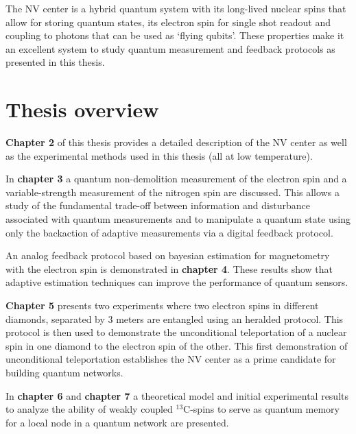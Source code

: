 The NV center is a hybrid quantum system with its long-lived nuclear spins that allow for storing quantum states, its electron spin for single shot readout and coupling to photons that can be used as `flying qubits'. These properties make it an excellent system to study quantum measurement and feedback protocols as presented in this thesis.

\section{Thesis overview}

\textbf{Chapter 2} of this thesis provides a detailed description of the NV center as well as the experimental methods used in this thesis (all at low temperature).

In \textbf{chapter 3} a quantum non-demolition measurement of the electron spin and a variable-strength measurement of the nitrogen spin are discussed. This allows a study of the fundamental trade-off between information and disturbance associated with quantum measurements and to manipulate a quantum state using only the backaction of adaptive measurements via a digital feedback protocol.

An analog feedback protocol based on bayesian estimation for magnetometry with the electron spin is demonstrated in \textbf{chapter 4}. These results show that adaptive estimation techniques can improve the performance of quantum sensors.

\textbf{Chapter 5} presents two experiments where two electron spins in different diamonds, separated by 3 meters are entangled using an heralded protocol. This protocol is then used to demonstrate the unconditional teleportation of a nuclear spin in one diamond to the electron spin of the other. This first demonstration of unconditional teleportation establishes the NV center as a prime candidate for building quantum networks.

In \textbf{chapter 6} and \textbf{chapter 7} a theoretical model and initial experimental results to analyze the ability of weakly coupled $^{13}$C-spins to serve as quantum memory for a local node in a quantum network are presented.

\clearpage




